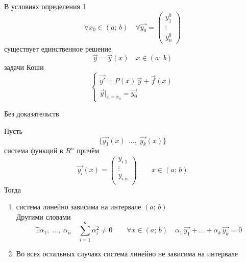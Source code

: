 \begin{Th}
    В условиях определения 1
    \[
        \forall x_0 \in (a;\, b) \quad \forall \vec{y_0} = \begin{pmatrix}y^0_1\\ \vdots\\ y^0_n \end{pmatrix}
    \]
    существует единственное решение 
    \[
        \vec{y} = \vec{y}(x) \quad x \in (a;\, b)
    \]
    задачи Коши
    \[
        \begin{cases}   
            \vec{y'} = P(x)\,\vec{y} + \vec{f}(x)\\
            \vec{y}|_{x=x_0} = \vec{y_0}
        \end{cases}
    \]   
\end{Th}

\begin{Proof}
    Без доказательств
\end{Proof}

\begin{Def}
    Пусть
    \[
        \{\vec{y_1}(x)\,\; \dots,\; \vec{y_k}(x)\}
    \]
    система функций в $R^{n}$ причём 
    \[
        \vec{y_i}(x) = 
        \begin{pmatrix}
            y_{i\;1}\\
            \vdots\\
            y_{i\;n}\\
        \end{pmatrix} \qquad x \in (a;\, b)  
    \]
    Тогда 
    \begin{enumerate}
        \item[\textbullet] система линейно зависима на интервале $(a;\, b)$\\
        Другими словами
        \[
            \exists \alpha_1,\; \dots,\; \alpha_n \quad \sum_{i=1}^{n}\alpha_i^2 \neq 0 \qquad \forall x \in(a;\,b) \quad \alpha_1\,\vec{y_1} + \dots + \alpha_k\,\vec{y_k} = 0
        \]
        
        \item[\textbullet] Во всех остальных случаях система линейно не зависима на интервале
    \end{enumerate}
\end{Def}

